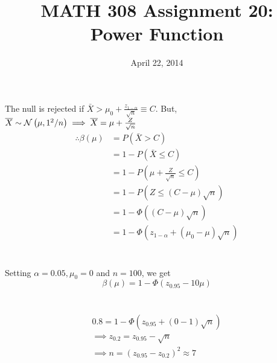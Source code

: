 \documentclass[twocolumn]{article}
\title{MATH 308 Assignment 20:\\Power Function}
\date{April 22, 2014}
\begin{document}
\maketitle
\section{}
The null is rejected if $\bar X>\mu_0+\frac{z_{1-\alpha}}{\sqrt{n}}\equiv C$. But, $\overline{X}\sim\mathcal{N}\left(\mu,1^2/n\right)\implies \overline{X}=\mu+\frac{Z}{\sqrt{n}}$ \begin{align*}
\therefore\beta(\mu)
&=P(\bar X >C)\\
&=1-P(\bar X \le C)\\
&=1-P\left(\mu+\frac{Z}{\sqrt{n}}\le C\right)\\
&=1-P(Z\le(C-\mu)\sqrt{n})\\
&=1-\Phi((C-\mu)\sqrt{n})\\
&=1-\Phi(z_{1-\alpha}+(\mu_0-\mu)\sqrt{n})
\end{align*}
\section{}
Setting $\alpha=0.05,\mu_0=0$ and $n=100$, we get
\[
\beta(\mu)=1-\Phi(z_{0.95}-10\mu)
\]
\section{}\begin{gather*}
0.8=1-\Phi(z_{0.95}+(0-1)\sqrt{n})\\
\implies z_{0.2}=z_{0.95}-\sqrt{n}\\
\implies n=(z_{0.95}-z_{0.2})^2\approx 7
\end{gather*}
\end{document}
